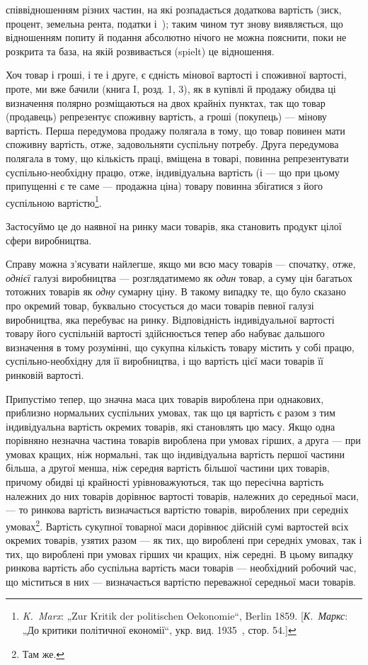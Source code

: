 \parcont{}  %
співвідношенням різних частин, на які розпадається додаткова
вартість (зиск, процент, земельна рента, податки і~); таким
чином тут знову виявляється, що відношенням попиту й подання
абсолютно нічого не можна пояснити, поки не розкрита та база,
на якій розвивається (spielt) це відношення.

Хоч товар і гроші, і те і друге, є єдність мінової вартості
і споживної вартості, проте, ми вже бачили (книга I, розд. 1, 3),
як в купівлі й продажу обидва ці визначення полярно розміщаються на двох крайніх пунктах, так що
товар (продавець)
репрезентує споживну вартість, а гроші (покупець) — мінову вартість. Перша передумова продажу
полягала в тому, що товар
повинен мати споживну вартість, отже, задовольняти суспільну
потребу. Друга передумова полягала в тому, що кількість
праці, вміщена в товарі, повинна репрезентувати суспільно-необхідну працю, отже, індивідуальна
вартість (і — що при цьому
припущенні є те саме — продажна ціна) товару повинна збігатися з його суспільною вартістю\footnote{
\emph{K.~Marx}: „Zur Kritik der politischen Oekonomie“, Berlin 1859. [\emph{К.~Маркс}:
„До критики політичної економії“, укр. вид. 1935~, стор. 54.]
}.

Застосуймо це до наявної на ринку маси товарів, яка становить продукт цілої сфери виробництва.

Справу можна з’ясувати найлегше, якщо ми всю масу товарів — спочатку, отже, \emph{однієї} галузі
виробництва — розглядатимемо
як \emph{один} товар, а суму цін багатьох тотожних товарів як \emph{одну}
сумарну ціну. В такому випадку те, що було сказано про окремий товар, буквально стосується до маси
товарів певної галузі
виробництва, яка перебуває на ринку. Відповідність індивідуальної вартості товару його суспільній
вартості здійснюється тепер
або набуває дальшого визначення в тому розумінні, що сукупна
кількість товару містить у собі працю, суспільно-необхідну для
її виробництва, і що вартість цієї маси товарів \deq{} її ринковій
вартості.

Припустімо тепер, що значна маса цих товарів вироблена
при однакових, приблизно нормальних суспільних умовах, так
що ця вартість є разом з тим індивідуальна вартість окремих
товарів, які становлять цю масу. Якщо одна порівняно незначна
частина товарів вироблена при умовах гірших, а друга — при умовах
кращих, ніж нормальні, так що індивідуальна вартість першої
частини більша, а другої менша, ніж середня вартість більшої частини цих товарів, причому обидві ці
крайності урівноважуються,
так що пересічна вартість належних до них товарів дорівнює
вартості товарів, належних до середньої маси, — то ринкова вартість визначається вартістю товарів,
вироблених при середніх
умовах\footnote{
Там же.
}. Вартість сукупної товарної маси дорівнює дійсній сумі
вартостей всіх окремих товарів, узятих разом — як тих, що вироблені при середніх умовах, так і тих,
що вироблені при умовах
гірших чи кращих, ніж середні. В цьому випадку ринкова
вартість або суспільна вартість маси товарів — необхідний робочий час, що міститься в них —
визначається вартістю переважної середньої маси товарів.

